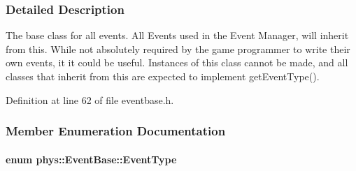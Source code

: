 \subsubsection{Detailed Description}
The base class for all events. All Events used in the Event Manager, will inherit from this. While not absolutely required by the game programmer to write their own events, it it could be useful. Instances of this class cannot be made, and all classes that inherit from this are expected to implement getEventType(). 

Definition at line 62 of file eventbase.h.



\subsubsection{Member Enumeration Documentation}
\hypertarget{classphys_1_1EventBase_a5e6a8564e127f654123f0bf6a2751923}{
\paragraph[{EventType}]{\setlength{\rightskip}{0pt plus 5cm}enum {\bf phys::EventBase::EventType}}\hfill}
\label{dd/d80/classphys_1_1EventBase_a5e6a8564e127f654123f0bf6a2751923}
